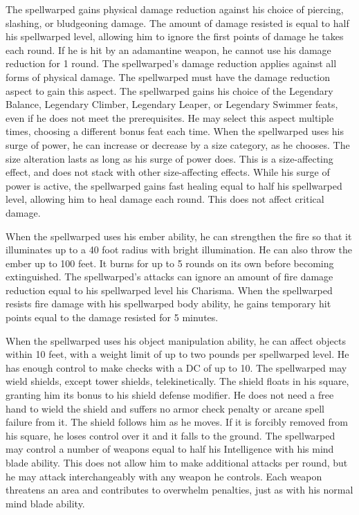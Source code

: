 The spellwarped gains physical damage reduction against his choice of piercing, slashing, or bludgeoning damage. The amount of damage resisted is equal to half his spellwarped level, allowing him to ignore the first points of damage he takes each round. If he is hit by an adamantine weapon, he cannot use his damage reduction for 1 round.
 The spellwarped's damage reduction applies against all forms of physical damage. The spellwarped must have the damage reduction aspect to gain this aspect.
 The spellwarped gains his choice of the Legendary Balance, Legendary Climber, Legendary Leaper, or Legendary Swimmer feats, even if he does not meet the prerequisites. He may select this aspect multiple times, choosing a different bonus feat each time.
 When the spellwarped uses his surge of power, he can increase or decrease by a size category, as he chooses. The size alteration lasts as long as his surge of power does. This is a size-affecting effect, and does not stack with other size-affecting effects.
 While his surge of power is active, the spellwarped gains fast healing equal to half his spellwarped level, allowing him to heal damage each round. This does not affect critical damage.

 When the spellwarped uses his ember ability, he can strengthen the fire so that it illuminates up to a 40 foot radius with bright illumination. He can also throw the ember up to 100 feet. It burns for up to 5 rounds on its own before becoming extinguished.
 The spellwarped's attacks can ignore an amount of fire damage reduction equal to his spellwarped level \add his Charisma.
 When the spellwarped resists fire damage with his spellwarped body ability, he gains temporary hit points equal to the damage resisted for 5 minutes.

 When the spellwarped uses his object manipulation ability, he can affect objects within 10 feet, with a weight limit of up to two pounds per spellwarped level. He has enough control to make checks with a DC of up to 10.
 The spellwarped may wield shields, except tower shields, telekinetically. The shield floats in his square, granting him its bonus to his shield defense modifier. He does not need a free hand to wield the shield and suffers no armor check penalty or arcane spell failure from it. The shield follows him as he moves. If it is forcibly removed from his square, he loses control over it and it falls to the ground.
 The spellwarped may control a number of weapons equal to half his Intelligence with his mind blade ability. This does not allow him to make additional attacks per round, but he may attack interchangeably with any weapon he controls. Each weapon threatens an area and contributes to overwhelm penalties, just as with his normal mind blade ability.

